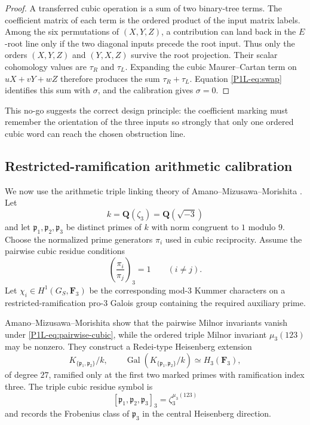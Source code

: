 \documentclass[11pt]{article}
\theoremstyle{remark}
\newcommand{\F}{\mathbf F}
\providecommand{\Q}{\mathbf Q}
\providecommand{\Gal}{\operatorname{Gal}}
\begin{document}
\begin{proof}
A transferred cubic operation is a sum of two binary-tree terms.  The coefficient matrix of each term is the ordered product of the input matrix labels.  Among the six permutations of \((X,Y,Z)\), a contribution can land back in the \(E\)-root line only if the two diagonal inputs precede the root input.  Thus only the orders \((X,Y,Z)\) and \((Y,X,Z)\) survive the root projection.  Their scalar cohomology values are \(\tau_R\) and \(\tau_L\).  Expanding the cubic Maurer--Cartan term on \(uX+vY+wZ\) therefore produces the sum \(\tau_R+\tau_L\).  Equation \eqref{P1L-eq:swap} identifies this sum with \(\sigma\), and the calibration gives \(\sigma=0\).
\end{proof}

This no-go suggests the correct design principle: the coefficient marking must remember the orientation of the three inputs so strongly that only one ordered cubic word can reach the chosen obstruction line.


\subsection{Restricted-ramification arithmetic calibration}

We now use the arithmetic triple linking theory of Amano--Mizusawa--Morishita \cite{AMM}.  Let
\[
 k=\Q(\zeta_3)=\Q(\sqrt{-3})
\]
and let \(\mathfrak p_1,\mathfrak p_2,\mathfrak p_3\) be distinct primes of \(k\) with norm congruent to \(1\) modulo \(9\).  Choose the normalized prime generators \(\pi_i\) used in cubic reciprocity.  Assume the pairwise cubic residue conditions
\begin{equation}\label{P1L-eq:pairwise-cubic}
 \left(\frac{\pi_i}{\pi_j}\right)_3=1
 \qquad (i\neq j).
\end{equation}
Let \(\chi_i\in H^1(G_S,\F_3)\) be the corresponding mod-3 Kummer characters on a restricted-ramification pro-3 Galois group containing the required auxiliary prime.

Amano--Mizusawa--Morishita show that the pairwise Milnor invariants vanish under \eqref{P1L-eq:pairwise-cubic}, while the ordered triple Milnor invariant \(\mu_3(123)\) may be nonzero.  They construct a Redei-type Heisenberg extension
\[
 K_{\{\mathfrak p_1,\mathfrak p_2\}}/k,
 \qquad
 \Gal(K_{\{\mathfrak p_1,\mathfrak p_2\}}/k)
 \simeq H_3(\F_3),
\]
of degree \(27\), ramified only at the first two marked primes with ramification index three.  The triple cubic residue symbol is
\[
 [\mathfrak p_1,\mathfrak p_2,\mathfrak p_3]_3
 =\zeta_3^{\mu_3(123)}
\]
and records the Frobenius class of \(\mathfrak p_3\) in the central Heisenberg direction.
\end{document}
